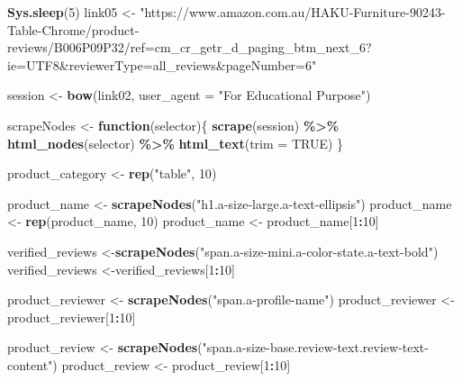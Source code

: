 \documentclass[
]{article}
\newenvironment{Shaded}{\begin{snugshade}}{\end{snugshade}}
\newcommand{\AttributeTok}[1]{\textcolor[rgb]{0.13,0.29,0.53}{#1}}
\newcommand{\ConstantTok}[1]{\textcolor[rgb]{0.56,0.35,0.01}{#1}}
\newcommand{\ControlFlowTok}[1]{\textcolor[rgb]{0.13,0.29,0.53}{\textbf{#1}}}
\newcommand{\DecValTok}[1]{\textcolor[rgb]{0.00,0.00,0.81}{#1}}
\newcommand{\FunctionTok}[1]{\textcolor[rgb]{0.13,0.29,0.53}{\textbf{#1}}}
\newcommand{\NormalTok}[1]{#1}
\newcommand{\OtherTok}[1]{\textcolor[rgb]{0.56,0.35,0.01}{#1}}
\newcommand{\SpecialCharTok}[1]{\textcolor[rgb]{0.81,0.36,0.00}{\textbf{#1}}}
\newcommand{\StringTok}[1]{\textcolor[rgb]{0.31,0.60,0.02}{#1}}
\begin{document}
\begin{Shaded}
\begin{Highlighting}[]
   \FunctionTok{Sys.sleep}\NormalTok{(}\DecValTok{5}\NormalTok{)}
\NormalTok{link05 }\OtherTok{\textless{}{-}} \StringTok{"https://www.amazon.com.au/HAKU{-}Furniture{-}90243{-}Table{-}Chrome/product{-}reviews/B006P09P32/ref=cm\_cr\_getr\_d\_paging\_btm\_next\_6?ie=UTF8\&reviewerType=all\_reviews\&pageNumber=6"}


\NormalTok{  session }\OtherTok{\textless{}{-}} \FunctionTok{bow}\NormalTok{(link02,}
               \AttributeTok{user\_agent =} \StringTok{"For Educational Purpose"}\NormalTok{)}

\NormalTok{  scrapeNodes }\OtherTok{\textless{}{-}} \ControlFlowTok{function}\NormalTok{(selector)\{}
    \FunctionTok{scrape}\NormalTok{(session) }\SpecialCharTok{\%\textgreater{}\%}
      \FunctionTok{html\_nodes}\NormalTok{(selector) }\SpecialCharTok{\%\textgreater{}\%}
      \FunctionTok{html\_text}\NormalTok{(}\AttributeTok{trim =} \ConstantTok{TRUE}\NormalTok{)}
\NormalTok{  \}}

\NormalTok{  product\_category }\OtherTok{\textless{}{-}} \FunctionTok{rep}\NormalTok{(}\StringTok{"table"}\NormalTok{, }\DecValTok{10}\NormalTok{)}

\NormalTok{  product\_name }\OtherTok{\textless{}{-}} \FunctionTok{scrapeNodes}\NormalTok{(}\StringTok{"h1.a{-}size{-}large.a{-}text{-}ellipsis"}\NormalTok{)}
\NormalTok{  product\_name }\OtherTok{\textless{}{-}} \FunctionTok{rep}\NormalTok{(product\_name, }\DecValTok{10}\NormalTok{)}
\NormalTok{  product\_name }\OtherTok{\textless{}{-}}\NormalTok{ product\_name[}\DecValTok{1}\SpecialCharTok{:}\DecValTok{10}\NormalTok{]}
  
\NormalTok{  verified\_reviews }\OtherTok{\textless{}{-}}\FunctionTok{scrapeNodes}\NormalTok{(}\StringTok{"span.a{-}size{-}mini.a{-}color{-}state.a{-}text{-}bold"}\NormalTok{)}
\NormalTok{  verified\_reviews }\OtherTok{\textless{}{-}}\NormalTok{verified\_reviews[}\DecValTok{1}\SpecialCharTok{:}\DecValTok{10}\NormalTok{]}
  
\NormalTok{  product\_reviewer }\OtherTok{\textless{}{-}} \FunctionTok{scrapeNodes}\NormalTok{(}\StringTok{"span.a{-}profile{-}name"}\NormalTok{)}
\NormalTok{  product\_reviewer }\OtherTok{\textless{}{-}}\NormalTok{ product\_reviewer[}\DecValTok{1}\SpecialCharTok{:}\DecValTok{10}\NormalTok{]}
  
\NormalTok{  product\_review }\OtherTok{\textless{}{-}} \FunctionTok{scrapeNodes}\NormalTok{(}\StringTok{"span.a{-}size{-}base.review{-}text.review{-}text{-}content"}\NormalTok{)}
\NormalTok{  product\_review }\OtherTok{\textless{}{-}}\NormalTok{ product\_review[}\DecValTok{1}\SpecialCharTok{:}\DecValTok{10}\NormalTok{]}
  

\end{Highlighting}
\end{Shaded}
\end{document}
